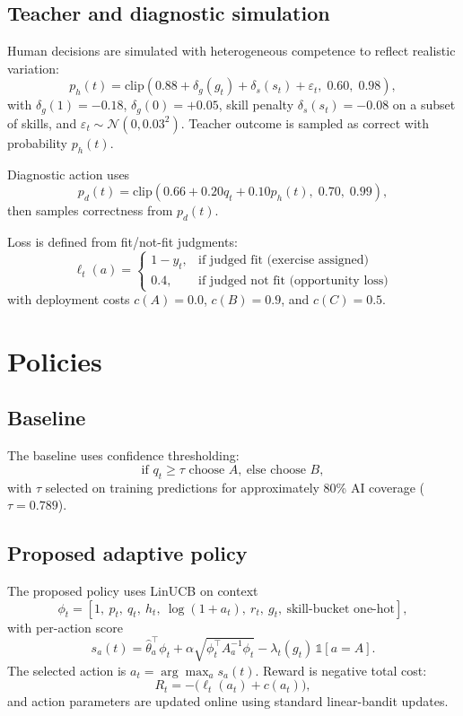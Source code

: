\documentclass{article}
\begin{document}
\subsection{Teacher and diagnostic simulation}
Human decisions are simulated with heterogeneous competence to reflect realistic variation:
\[
p_h(t)=\mathrm{clip}\!\left(0.88 + \delta_g(g_t) + \delta_s(s_t) + \varepsilon_t,\;0.60,\;0.98\right),
\]
with \(\delta_g(1)=-0.18\), \(\delta_g(0)=+0.05\), skill penalty \(\delta_s(s_t)=-0.08\) on a subset of skills, and \(\varepsilon_t\sim\mathcal{N}(0,0.03^2)\).
Teacher outcome is sampled as correct with probability \(p_h(t)\).

Diagnostic action uses
\[
p_d(t)=\mathrm{clip}\!\left(0.66 + 0.20q_t + 0.10p_h(t),\;0.70,\;0.99\right),
\]
then samples correctness from \(p_d(t)\).

Loss is defined from fit/not-fit judgments:
\[
\ell_t(a)=
\begin{cases}
1-y_t, & \text{if judged fit (exercise assigned)}\\
0.4, & \text{if judged not fit (opportunity loss)}
\end{cases}
\]
with deployment costs \(c(A)=0.0\), \(c(B)=0.9\), and \(c(C)=0.5\).

\section{Policies}
\subsection{Baseline}
The baseline uses confidence thresholding:
\[
\text{if } q_t\ge \tau \text{ choose }A,\ \text{else choose }B,
\]
with \(\tau\) selected on training predictions for approximately 80\% AI coverage (\(\tau=0.789\)).

\subsection{Proposed adaptive policy}
The proposed policy uses LinUCB \citep{lattimore_bandit} on context
\[
\phi_t=[1,\ p_t,\ q_t,\ h_t,\ \log(1+a_t),\ r_t,\ g_t,\ \text{skill-bucket one-hot}],
\]
with per-action score
\[
s_a(t)=\hat\theta_a^\top \phi_t + \alpha\sqrt{\phi_t^\top A_a^{-1}\phi_t}
- \lambda_t(g_t)\,\mathbb{1}[a=A].
\]
The selected action is \(a_t=\arg\max_a s_a(t)\). Reward is negative total cost:
\[
R_t = -\big(\ell_t(a_t)+c(a_t)\big),
\]
and action parameters are updated online using standard linear-bandit updates.
\end{document}
